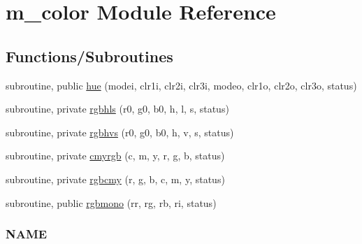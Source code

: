 \hypertarget{namespacem__color}{}\section{m\+\_\+color Module Reference}
\label{namespacem__color}
\subsection*{Functions/\+Subroutines}
\begin{DoxyCompactItemize}
\item 
subroutine, public \mbox{\hyperlink{namespacem__color_a56dd07bbf1378ccc78a230d171f9d429}{hue}} (modei, clr1i, clr2i, clr3i, modeo, clr1o, clr2o, clr3o, status)
\item 
subroutine, private \mbox{\hyperlink{namespacem__color_a1dd027cbe65112af243d26195b1fc49a}{rgbhls}} (r0, g0, b0, h, l, s, status)
\item 
subroutine, private \mbox{\hyperlink{namespacem__color_a76f00e1d418c4904a963094bc730a0e6}{rgbhvs}} (r0, g0, b0, h, v, s, status)
\item 
subroutine, private \mbox{\hyperlink{namespacem__color_ab91687e87d0901874e52efe5933e3044}{cmyrgb}} (c, m, y, r, g, b, status)
\item 
subroutine, private \mbox{\hyperlink{namespacem__color_ad6e8505eef5add299c4475d289f3c5c5}{rgbcmy}} (r, g, b, c, m, y, status)
\item 
subroutine, public \mbox{\hyperlink{namespacem__color_aca19999686fc20d79da580c6a643dc35}{rgbmono}} (rr, rg, rb, ri, status)
\begin{DoxyCompactList}\small\item\em \subsubsection*{N\+A\+ME}


\end{DoxyCompactList}
\end{DoxyCompactItemize}
